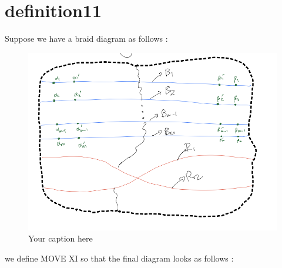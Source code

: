 \section{definition11}
\begin{definition}
\end{definition}

Suppose we have a braid diagram as follows :

\begin{figure}[H] %
    \centering
    \includegraphics[width=\linewidth]{diagrams/definition11/1.png} %
    \caption{Your caption here}
    \label{fig:your-label}
\end{figure}

we define MOVE \RN{11} so that the final diagram looks as follows :

